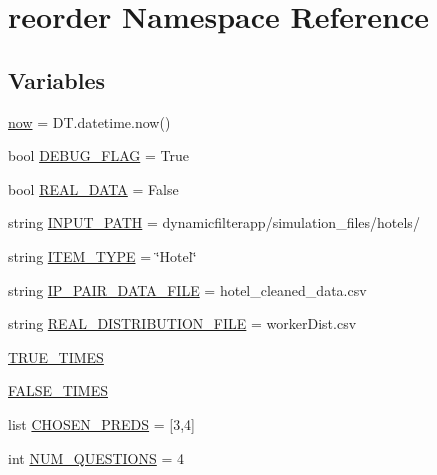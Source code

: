 \hypertarget{namespacereorder}{}\section{reorder Namespace Reference}
\label{namespacereorder}
\subsection*{Variables}
\begin{DoxyCompactItemize}
\item 
\mbox{\hyperlink{namespacereorder_afdc24ca189ea1f66dfd9245b4c970d59}{now}} = D\+T.\+datetime.\+now()
\item 
bool \mbox{\hyperlink{namespacereorder_a5c62a4f8ba41755a0f5e48c54c4705b8}{D\+E\+B\+U\+G\+\_\+\+F\+L\+AG}} = True
\item 
bool \mbox{\hyperlink{namespacereorder_a00674fe8ef8f59b37d7fe239813bb627}{R\+E\+A\+L\+\_\+\+D\+A\+TA}} = False
\item 
string \mbox{\hyperlink{namespacereorder_aca6b14e235be3a92f729918cfcfed5e5}{I\+N\+P\+U\+T\+\_\+\+P\+A\+TH}} = \textquotesingle{}dynamicfilterapp/simulation\+\_\+files/hotels/\textquotesingle{}
\item 
string \mbox{\hyperlink{namespacereorder_ab7ef0f87c772b28128250ee46f5390ab}{I\+T\+E\+M\+\_\+\+T\+Y\+PE}} = \char`\"{}Hotel\char`\"{}
\item 
string \mbox{\hyperlink{namespacereorder_a43d654f8629542974ec1db04c0fc580a}{I\+P\+\_\+\+P\+A\+I\+R\+\_\+\+D\+A\+T\+A\+\_\+\+F\+I\+LE}} = \textquotesingle{}hotel\+\_\+cleaned\+\_\+data.\+csv\textquotesingle{}
\item 
string \mbox{\hyperlink{namespacereorder_ad581376e3eb6ca15bbbe096863891cec}{R\+E\+A\+L\+\_\+\+D\+I\+S\+T\+R\+I\+B\+U\+T\+I\+O\+N\+\_\+\+F\+I\+LE}} = \textquotesingle{}worker\+Dist.\+csv\textquotesingle{}
\item 
\mbox{\hyperlink{namespacereorder_a6794acc9ab30adea862f4077cf9adae7}{T\+R\+U\+E\+\_\+\+T\+I\+M\+ES}}
\item 
\mbox{\hyperlink{namespacereorder_a809d01bf46cd20093532e7cbc0960874}{F\+A\+L\+S\+E\+\_\+\+T\+I\+M\+ES}}
\item 
list \mbox{\hyperlink{namespacereorder_a4cf7283f335a2c863799ccaca109e4c9}{C\+H\+O\+S\+E\+N\+\_\+\+P\+R\+E\+DS}} = \mbox{[}3,4\mbox{]}
\item 
int \mbox{\hyperlink{namespacereorder_a6e9b8f89b507e81efe828c45c51e3906}{N\+U\+M\+\_\+\+Q\+U\+E\+S\+T\+I\+O\+NS}} = 4
\item 

\end{DoxyCompactItemize}
